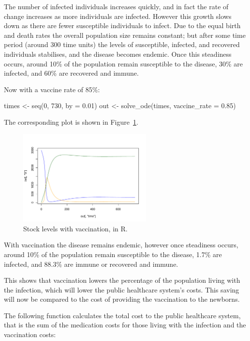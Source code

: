 The number of infected individuals increases quickly, and in fact the rate of
change increases as more individuals are infected. However this growth slows
down as there are fewer susceptible individuals to infect. Due to the equal
birth and death rates the overall population size remains constant; but after
some time period (around 300 time units) the levels of susceptible, infected,
and recovered individuals stabilises, and the disease becomes endemic. Once this
steadiness occurs, around 10\% of the population remain susceptible to the
disease, 30\% are infected, and 60\% are recovered and immune.

Now with a vaccine rate of 85\%:

\begin{Rin}
times <- seq(0, 730, by = 0.01)
out <- solve_ode(times, vaccine_rate = 0.85)
\end{Rin}

The corresponding plot is shown in Figure~\ref{fig:plot_with_vaccine_R}.

\begin{figure}
\begin{center}
\includegraphics[width=0.6\textwidth]{./assets/sd_vaccine_plots/plot_with_vaccine_R.pdf}
\end{center}
\caption{Stock levels with vaccination, in R.}
\label{fig:plot_with_vaccine_R}
\end{figure}

With vaccination the disease remains endemic, however once steadiness occurs,
around 10\% of the population remain susceptible to the disease, 1.7\% are
infected, and 88.3\% are immune or recovered and immune.

This shows that vaccination lowers the percentage of the population living with
the infection, which will lower the public healthcare system's costs.
This saving will now be compared to the cost of providing the vaccination to the
newborns.

The following function calculates the total cost to the public healthcare
system, that is the sum of the medication costs for those living with the
infection and the vaccination costs:

